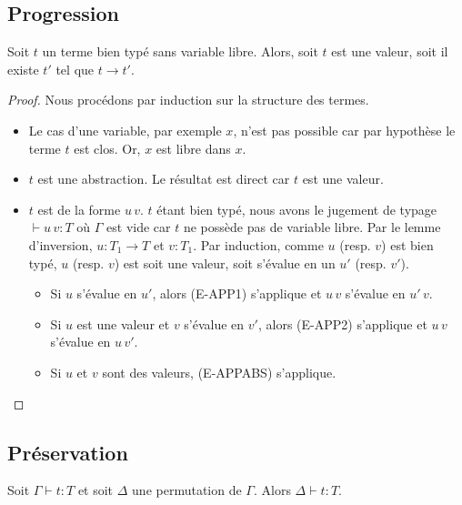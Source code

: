 \subsection*{Progression}

\begin{theorem} 
  \label{thm:simply-typed-lambda-calculus-progression}
  Soit $t$ un terme bien typé sans variable libre. Alors, soit $t$ est une
  valeur, soit il existe $t'$ tel que $t \rightarrow t'$.
\end{theorem}

\begin{proof}
  \label{proof:simply-typed-lambda-calculus-progression}
  Nous procédons par induction sur la structure des termes.
  \begin{itemize}
    \item Le cas d'une variable, par exemple $x$, n'est pas possible car par
      hypothèse le terme $t$ est clos. Or, $x$ est libre dans $x$.
    \item $t$ est une abstraction. Le résultat est direct car $t$ est une valeur.
    \item $t$ est de la forme $u \, v$. $t$ étant
      bien typé, nous avons le jugement de typage $\vdash u \, v : T$ où $\Gamma$ est
      vide car $t$ ne possède pas de variable libre. Par le lemme
      d'inversion, $u : T_{1} \rightarrow T$ et $v : T_{1}$. Par induction,
      comme $u$ (resp. $v$) est bien typé, $u$ (resp. $v$) est soit une valeur,
      soit s'évalue en un $u'$ (resp. $v'$).
      \begin{itemize}
        \item Si $u$ s'évalue en $u'$, alors (E-APP1) s'applique et $u \, v$
          s'évalue en $u' \, v$.
        \item Si $u$ est une valeur et $v$ s'évalue en $v'$, alors (E-APP2)
          s'applique et $u \, v$ s'évalue en $u \, v'$.
        \item Si $u$ et $v$ sont des valeurs, (E-APPABS) s'applique.
      \end{itemize}
  \end{itemize}
\end{proof}

\subsection*{Préservation}

\begin{lemma} [de permutation]
  \label{thm:simply-typed-lambda-calculus-permutation}
  Soit $\Gamma \vdash t : T$ et soit $\Delta$ une permutation de $\Gamma$. Alors
  $\Delta \vdash t : T$.
\end{lemma}

